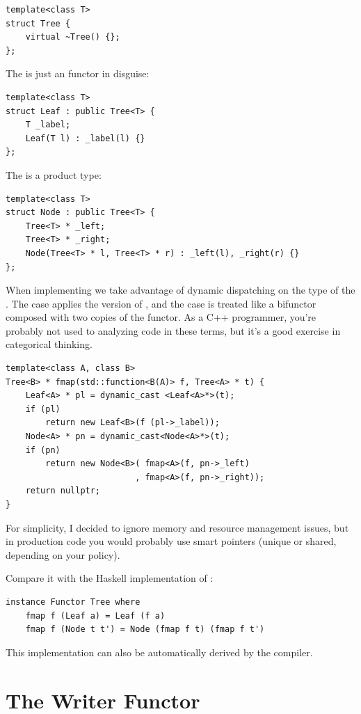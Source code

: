 \begin{Verbatim}
template<class T>
struct Tree { 
    virtual ~Tree() {};
};
\end{Verbatim}
The  is just an  functor in disguise:

\begin{Verbatim}
template<class T>
struct Leaf : public Tree<T> {
    T _label;
    Leaf(T l) : _label(l) {}
};
\end{Verbatim}
The  is a product type:

\begin{Verbatim}
template<class T>
struct Node : public Tree<T> {
    Tree<T> * _left;
    Tree<T> * _right;
    Node(Tree<T> * l, Tree<T> * r) : _left(l), _right(r) {}
};
\end{Verbatim}
When implementing  we take advantage of dynamic dispatching
on the type of the . The  case applies the
 version of , and the  case
is treated like a bifunctor composed with two copies of the
 functor. As a C++ programmer, you're probably not used to
analyzing code in these terms, but it's a good exercise in categorical
thinking.

\begin{Verbatim}
template<class A, class B>
Tree<B> * fmap(std::function<B(A)> f, Tree<A> * t) {
    Leaf<A> * pl = dynamic_cast <Leaf<A>*>(t);
    if (pl)
        return new Leaf<B>(f (pl->_label));
    Node<A> * pn = dynamic_cast<Node<A>*>(t);
    if (pn)
        return new Node<B>( fmap<A>(f, pn->_left) 
                          , fmap<A>(f, pn->_right));
    return nullptr;
}
\end{Verbatim}
For simplicity, I decided to ignore memory and resource management
issues, but in production code you would probably use smart pointers
(unique or shared, depending on your policy).

Compare it with the Haskell implementation of :

\begin{Verbatim}
instance Functor Tree where
    fmap f (Leaf a) = Leaf (f a)
    fmap f (Node t t') = Node (fmap f t) (fmap f t')
\end{Verbatim}
This implementation can also be automatically derived by the compiler.

\section{The Writer Functor}\label{the-writer-functor}

